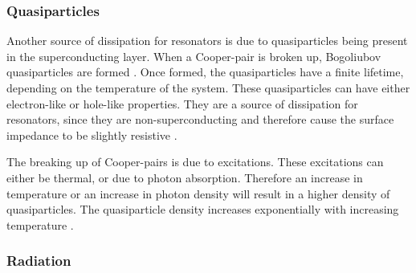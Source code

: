 \documentclass[12pt]{report}
\begin{document}
\subsubsection{Quasiparticles}

Another source of dissipation for resonators is due to quasiparticles being present in the superconducting layer. When a Cooper-pair is broken up, Bogoliubov quasiparticles are formed \cite[p.~16]{Barends}. Once formed, the quasiparticles have a finite lifetime, depending on the temperature of the system. These quasiparticles can have either electron-like or hole-like properties. They are a source of dissipation for resonators, since they are non-superconducting and therefore cause the surface impedance to be slightly resistive \cite[p.~18]{Mazin}.

The breaking up of Cooper-pairs is due to excitations. These excitations can either be thermal, or due to photon absorption. Therefore an increase in temperature or an increase in photon density will result in a higher density of quasiparticles. The quasiparticle density increases exponentially with increasing temperature \cite[p.~44]{Mazin}.





\subsubsection{Radiation}
\end{document}
